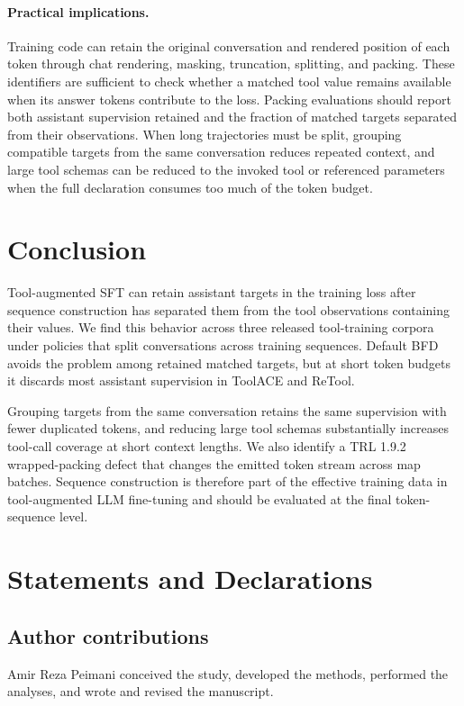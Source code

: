 \documentclass[pdflatex,sn-basic,Numbered]{sn-jnl}
\begin{document}
\paragraph{Practical implications.}
Training code can retain the original conversation and rendered position of each token through
chat rendering, masking, truncation, splitting, and packing. These identifiers are sufficient to
check whether a matched tool value remains available when its answer tokens contribute to the
loss. Packing evaluations should report both assistant supervision retained and the fraction of
matched targets separated from their observations. When long trajectories must be split, grouping
compatible targets from the same conversation reduces repeated context, and large tool schemas can
be reduced to the invoked tool or referenced parameters when the full declaration consumes too
much of the token budget.


\section{Conclusion}

Tool-augmented SFT can retain assistant targets in the training loss after sequence construction
has separated them from the tool observations containing their values. We find this behavior
across three released tool-training corpora under policies that split conversations across training
sequences. Default BFD avoids the problem among retained matched targets, but at short token
budgets it discards most assistant supervision in ToolACE and ReTool.

Grouping targets from the same conversation retains the same supervision with fewer duplicated
tokens, and reducing large tool schemas substantially increases tool-call coverage at short context
lengths. We also identify a TRL 1.9.2 wrapped-packing defect that changes the emitted token stream
across map batches. Sequence construction is therefore part of the effective training data in
tool-augmented LLM fine-tuning and should be evaluated at the final token-sequence level.


\backmatter
\section*{Statements and Declarations}
\subsection*{Author contributions}
Amir Reza Peimani conceived the study, developed the methods, performed the
analyses, and wrote and revised the manuscript.
\end{document}
